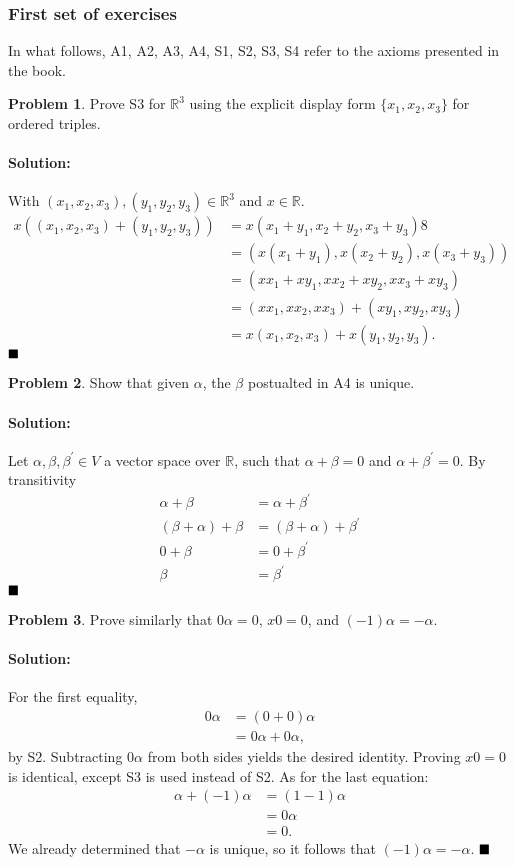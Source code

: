 \documentclass[]{article}
\newcommand{\RR}{\mathbb{R}}
\theoremstyle{definition}
\newtheorem{problem}{Problem}
\newenvironment{solution}{\paragraph{Solution:}}{\hfill$\blacksquare \\$}
\begin{document}
\subsubsection{First set of exercises}
In what follows, A1, A2, A3, A4, S1, S2, S3, S4 refer to the axioms presented in the book.
\begin{problem}
	Prove S3 for $\RR^3$ using the explicit display form $\{x_1, x_2, x_3\}$ for ordered triples.
\end{problem}
\begin{solution}

With $(x_1, x_2, x_3), (y_1, y_2, y_3) \in \RR^3$ and $x \in \RR$. 
	\begin{align*} 
		x((x_1, x_2, x_3) + (y_1, y_2, y_3)) &= x(x_1 + y_1, x_2 + y_2, x_3 + y_3) 8 \\ 
	 &=  (x(x_1 + y_1), x(x_2 + y_2), x(x_3 + y_3)) \\
	 &= (xx_1 + xy_1, xx_2 + xy_2, xx_3 + xy_3) \\
	 &= (xx_1, xx_2, xx_3) + (xy_1, xy_2, xy_3) \\
	 &= x(x_1, x_2, x_3) + x(y_1, y_2, y_3).
	\end{align*}
\end{solution}
\begin{problem}
	Show that given $\alpha$, the $\beta$ postualted in A4 is unique.
\end{problem}
\begin{solution}
	Let $\alpha, \beta, \beta^\prime \in V$ a vector space over $\RR$, such that $\alpha + \beta = 0$ and $\alpha + \beta^\prime = 0$. By transitivity
	\begin{align*}
		\alpha + \beta &= \alpha + \beta^\prime \\
		(\beta + \alpha) + \beta &= (\beta + \alpha) + \beta^\prime \\
		0 + \beta &= 0 + \beta^\prime \\
		\beta &= \beta^\prime
	\end{align*}
\end{solution}
\begin{problem}
	Prove similarly that $0\alpha = 0$, $x0 = 0$, and $(-1)\alpha = -\alpha$.
\end{problem}
\begin{solution}
For the first equality, 
\begin{align*}
	0\alpha &= (0 + 0)\alpha \\
	& = 0\alpha + 0\alpha,
\end{align*}
 by S2. Subtracting $0\alpha$ from both sides yields the desired identity. Proving $x0 = 0$ is identical, except S3 is used instead of S2. As for the last equation:
 \begin{align*}
 	\alpha + (-1)\alpha &= (1 - 1)\alpha \\
 	&= 0\alpha \\
 	&= 0.
 \end{align*}
 We already determined that $-\alpha$ is unique, so it follows that $(-1)\alpha = -\alpha$.
\end{solution}
\end{document}
